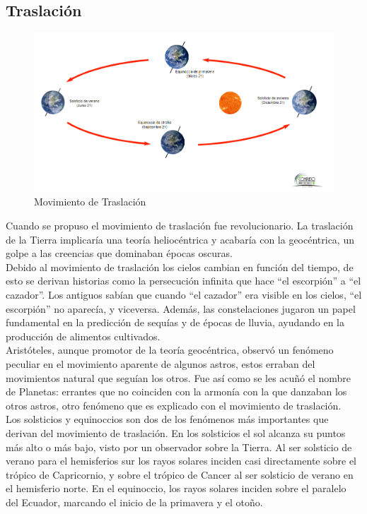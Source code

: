 \documentclass[10pt,a4paper]{article}
\begin{document}
\subsection{Traslación}

\begin{figure}[H]
\centering
\includegraphics[scale=0.45]{Imagenes/Traslacion_01} 
\caption{Movimiento de Traslación}
\label{m_traslacion}
\end{figure}

Cuando se propuso el movimiento de traslación fue revolucionario. La traslación de la Tierra implicaría una teoría heliocéntrica y acabaría con la geocéntrica, un golpe a las creencias que dominaban épocas oscuras.  \\ 

Debido al movimiento de traslación los cielos cambian en función del tiempo, de esto se derivan historias como la persecución infinita que hace ``el escorpión'' a ``el cazador''. Los antiguos sabían que cuando ``el cazador'' era visible en los cielos, ``el escorpión'' no aparecía, y viceversa. Además, las constelaciones jugaron un papel fundamental en la predicción de sequías y de épocas de lluvia, ayudando en la producción de alimentos cultivados. \\

Aristóteles, aunque promotor de la teoría geocéntrica, observó un fenómeno peculiar en el movimiento aparente de algunos astros, estos erraban del movimientos natural que seguían los otros. Fue así como se les acuñó el nombre de Planetas: errantes que no coinciden con la armonía con la que danzaban los otros astros, otro fenómeno que es explicado con el movimiento de traslación. \\

Los solsticios y equinoccios son dos de los fenómenos más importantes que derivan del movimiento de traslación. En los solsticios el sol alcanza su puntos más alto o más bajo, visto por un observador sobre la Tierra.  Al ser solsticio de verano para el hemisferios sur los rayos solares inciden casi directamente sobre el trópico de Capricornio, y sobre el trópico de Cancer al ser solsticio de verano en el hemisferio norte. En el equinoccio, los rayos solares inciden sobre el paralelo del Ecuador, marcando el inicio de la primavera y el otoño.
\end{document}
